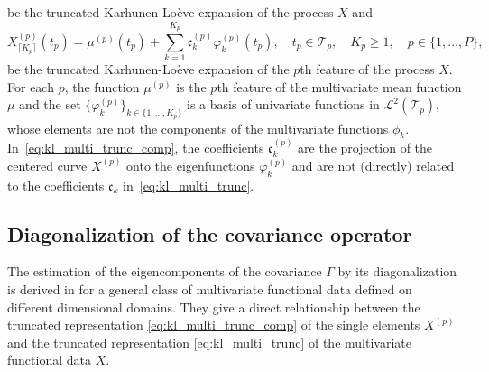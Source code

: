 \documentclass[times,sort&compress,3p]{elsarticle}
\theoremstyle{plain}%
\theoremstyle{definition}
\newcommand{\TT}[1]{\mathcal{T}_{#1}} %
\newcommand{\sLp}[1]{\mathcal{L}^{2}(#1)} %
\newcommand{\Xp}[1]{X^{(#1)}} %
\newcommand{\mup}[1]{\mu^{(#1)}} %
\begin{document}
be the truncated Karhunen-Loève expansion of the process $X$ and
\begin{equation}\label{eq:kl_multi_trunc_comp}
    X_{\lceil K_p \rceil}^{(p)}(t_p) = \mup{p}(t_p) + \sum_{k = 1}^{K_p} \mathfrak{c}^{(p)}_k \varphi_k^{(p)}(t_p), \quad t_p \in \TT{p}, \quad K_p \geq 1, \quad p \in \{1, \dots, P\},
\end{equation}
be the truncated Karhunen-Loève expansion of the $p$th feature of the process $X$. For each $p$, the function $\mup{p}$ is the $p$th feature of the multivariate mean function $\mu$ and the set $\{\varphi^{(p)}_k\}_{k \in \{1, \dots, K_p\}}$ is a basis of univariate functions in $\sLp{\TT{p}}$, whose elements are not the components of the multivariate functions $\phi_k$. In~\eqref{eq:kl_multi_trunc_comp}, the coefficients $\mathfrak{c}^{(p)}_k$ are the projection of the centered curve $\Xp{p}$ onto the eigenfunctions $\varphi_k^{(p)}$ and are not (directly) related to the coefficients $\mathfrak{c}_k$ in~\eqref{eq:kl_multi_trunc}.


\subsection{Diagonalization of the covariance operator} %
\label{sub:by_diagonalization_of_the_covariance_operator}

The estimation of the eigencomponents of the covariance $\Gamma$ by its diagonalization is derived in \cite{happMultivariateFunctionalPrincipal2018a} for a general class of multivariate functional data defined on different dimensional domains. They give a direct relationship between the truncated representation \eqref{eq:kl_multi_trunc_comp} of the single elements $X^{(p)}$ and the truncated representation \eqref{eq:kl_multi_trunc} of the multivariate functional data $X$.
\end{document}
